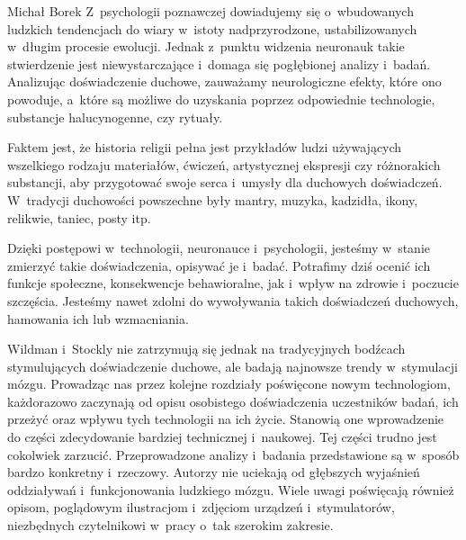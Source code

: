 \begin{newrevplenv}{Michał Borek}
Z~psychologii poznawczej dowiadujemy się o~wbudowanych ludzkich tendencjach do wiary w~istoty nadprzyrodzone, ustabilizowanych w~długim procesie ewolucji. Jednak z~punktu widzenia neuronauk takie stwierdzenie jest niewystarczające i~domaga się pogłębionej analizy i~badań. Analizując doświadczenie duchowe, zauważamy neurologiczne efekty, które ono powoduje, a~które są możliwe do uzyskania poprzez odpowiednie technologie, substancje halucynogenne, czy rytuały.

Faktem jest, że historia religii pełna jest przykładów ludzi używających wszelkiego rodzaju materiałów, ćwiczeń, artystycznej ekspresji czy różnorakich substancji, aby przygotować swoje serca i~umysły dla duchowych doświadczeń. W~tradycji duchowości powszechne były mantry, muzyka, kadzidła, ikony, relikwie, taniec, posty itp.

Dzięki postępowi w~technologii, neuronauce i~psychologii, jesteśmy w~stanie zmierzyć takie doświadczenia, opisywać je i~badać. Potrafimy dziś ocenić ich funkcje społeczne, konsekwencje behawioralne, jak i~wpływ na zdrowie i~poczucie szczęścia. Jesteśmy nawet zdolni do wywoływania takich doświadczeń duchowych, hamowania ich lub wzmacniania.

Wildman i~Stockly nie zatrzymują się jednak na tradycyjnych bodźcach stymulujących doświadczenie duchowe, ale badają najnowsze trendy w~stymulacji mózgu. Prowadząc nas przez kolejne rozdziały poświęcone nowym technologiom, każdorazowo zaczynają od opisu osobistego doświadczenia uczestników badań, ich przeżyć oraz wpływu tych technologii na ich życie. Stanowią one wprowadzenie do części zdecydowanie bardziej technicznej i~naukowej. Tej części trudno jest cokolwiek zarzucić. Przeprowadzone analizy i~badania przedstawione są w~sposób bardzo konkretny i~rzeczowy. Autorzy nie uciekają od głębszych wyjaśnień oddziaływań i~funkcjonowania ludzkiego mózgu. Wiele uwagi poświęcają również opisom, poglądowym ilustracjom i~zdjęciom urządzeń i~stymulatorów, niezbędnych czytelnikowi w~pracy o~tak szerokim zakresie.


\end{newrevplenv}
